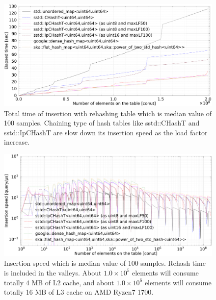 \begin{figure}[h]
  \includegraphics[scale=0.24]{./fig_bench_sm/insert_et_med.pdf}
  \caption{
    Total time of insertion with rehashing table which is median value of 100 samples.
    Chaining type of hash tables like sstd::CHashT and sstd::IpCHashT are slow down its insertion speed as the load factor increase.
  }
  \label{fig_bench_insert_wRehash_sm}
\end{figure}

\begin{figure}[h]
  \hspace{-3mm}
  \includegraphics[scale=0.24]{./fig_bench_sm/insert_med.pdf}
  \caption{
    Insertion speed which is median value of 100 samples.
    Rehash time is included in the valleys.
    About $1.0\times10^5$ elements will consume totally 4 MB of L2 cache,
    and about $1.0\times10^6$ elements will consume totally 16 MB of L3 cache on AMD Ryzen7 1700.
  }
  \label{fig_bench_insert_sm}
\end{figure}



